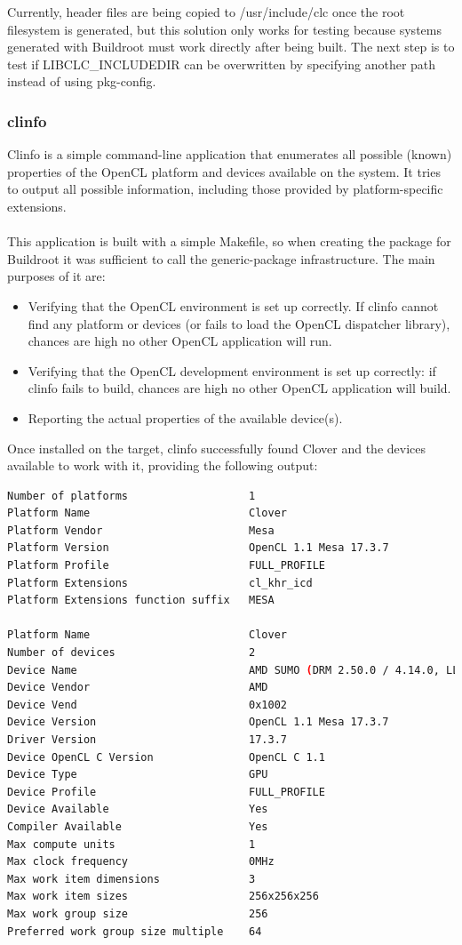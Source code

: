 \documentclass[12pt,a4paper,oneside]{article}
\begin{document}
Currently, header files are being copied to /usr/include/clc once the root
filesystem is generated, but this solution only works for testing because systems
generated with Buildroot must work directly after being built. The next step
is to test if LIBCLC\_INCLUDEDIR can be overwritten by specifying another path
instead of using pkg-config.

\subsubsection*{clinfo}
Clinfo is a simple command-line application that enumerates all possible (known)
properties of the OpenCL platform and devices available on the system. It tries
to output all possible information, including those provided by platform-specific
extensions.\\\\
This application is built with a simple Makefile, so when creating the package
for Buildroot it was sufficient to call the generic-package infrastructure. The
main purposes of it are:
\begin{itemize}
  \item Verifying that the OpenCL environment is set up correctly. If clinfo
  cannot find any platform or devices (or fails to load the OpenCL dispatcher
  library), chances are high no other OpenCL application will run.
  \item Verifying that the OpenCL development environment is set up correctly:
  if clinfo fails to build, chances are high no other OpenCL application will
  build.
  \item Reporting the actual properties of the available device(s).
\end{itemize}
Once installed on the target, clinfo successfully found Clover and the devices
available to work with it, providing the following output:\\
\begin{lstlisting}[language=sh,caption={Output of clinfo},captionpos=b,keywords={}]
Number of platforms                   1
Platform Name                         Clover
Platform Vendor                       Mesa
Platform Version                      OpenCL 1.1 Mesa 17.3.7
Platform Profile                      FULL_PROFILE
Platform Extensions                   cl_khr_icd
Platform Extensions function suffix   MESA

Platform Name                         Clover
Number of devices                     2
Device Name                           AMD SUMO (DRM 2.50.0 / 4.14.0, LLVM 5.0.1)
Device Vendor                         AMD
Device Vend                           0x1002
Device Version                        OpenCL 1.1 Mesa 17.3.7
Driver Version                        17.3.7
Device OpenCL C Version               OpenCL C 1.1
Device Type                           GPU
Device Profile                        FULL_PROFILE
Device Available                      Yes
Compiler Available                    Yes
Max compute units                     1
Max clock frequency                   0MHz
Max work item dimensions              3
Max work item sizes                   256x256x256
Max work group size                   256
Preferred work group size multiple    64
\end{lstlisting}
\end{document}
